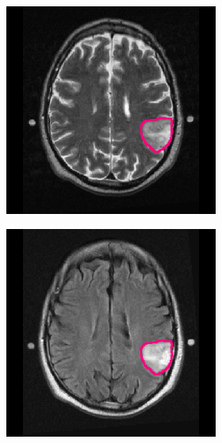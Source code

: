 \begin{subappendices}
\begin{figure}[htbp]
\begin{subfigure}[b]{0.8\textwidth}
\begin{subfigure}[b]{0.215\textwidth}
        \end{subfigure}
        \hfill
        \begin{subfigure}[b]{0.215\textwidth}
        \includegraphics[width=\textwidth, clip, trim=2.5cm 0.5cm 2.5cm 0.5cm]{Figures/Random_segs/T2_TCGA-FG-5964.png}
        \end{subfigure}
        \hfill
        \begin{subfigure}[b]{0.215\textwidth}
        \includegraphics[width=\textwidth, clip, trim=2.5cm 0.5cm 2.5cm 0.5cm]{Figures/Random_segs/FLAIR_TCGA-FG-5964.png}

\end{subfigure}
\end{subfigure}
\end{figure}
\end{subappendices}
